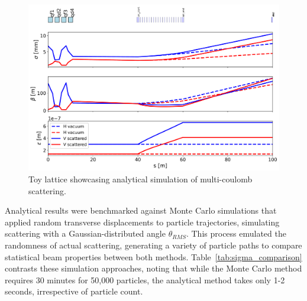 \documentclass[a4paper,
               biblatex,     %
               ]{jacow}
\begin{document}
\begin{figure}[!htb]
   \centering
   \includegraphics*[width=1.0\columnwidth]{air_scattering.png}
   \caption{Toy lattice showcasing analytical simulation of multi-coulomb scattering.}
   \label{fig:simple_line}
\end{figure}

Analytical results were benchmarked against Monte Carlo simulations that applied random transverse displacements to particle trajectories, simulating scattering with a Gaussian-distributed angle $\theta_{RMS}$. This process emulated the randomness of actual scattering, generating a variety of particle paths to compare statistical beam properties between both methods. Table~\ref{tab:sigma_comparison} contrasts these simulation approaches, noting that while the Monte Carlo method requires 30 minutes for 50,000 particles, the analytical method takes only 1-2 seconds, irrespective of particle count.

\begin{table}[ht]
\centering
{}
\caption{Simulated beam size for analytical and Monte Carlo methods in non-scattered and scattered particle distributions.}
\label{tab:sigma_comparison}
\end{table}
\end{document}
